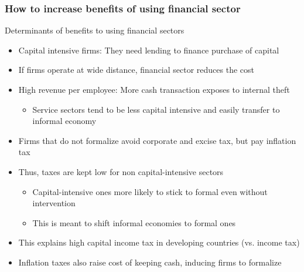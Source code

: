\documentclass[aspectratio=169]{beamer}
\begin{document}
\begin{frame}
\frametitle{How to increase benefits of using financial sector} 
Determinants of benefits to using financial sectors
\begin{itemize}\setlength\itemsep{3pt}
\item Capital intensive firms: They need lending to finance purchase of capital
\item If firms operate at wide distance, financial sector reduces the cost
\item High revenue per employee: More cash transaction exposes to internal theft
\begin{itemize}
\item Service sectors tend to be less capital intensive and easily transfer to informal economy
\end{itemize}
\item Firms that do not formalize avoid corporate and excise tax, but pay inflation tax
\item Thus, taxes are kept low for non capital-intensive sectors
\begin{itemize}\setlength\itemsep{3pt}
\item Capital-intensive ones more likely to stick to formal even without intervention
\item This is meant to shift informal economies to formal ones
\end{itemize}

\item This explains high capital income tax in developing countries (vs. income tax)
\item Inflation taxes also raise cost of keeping cash, inducing firms to formalize
\end{itemize}\medskip

\end{frame}
\end{document}
